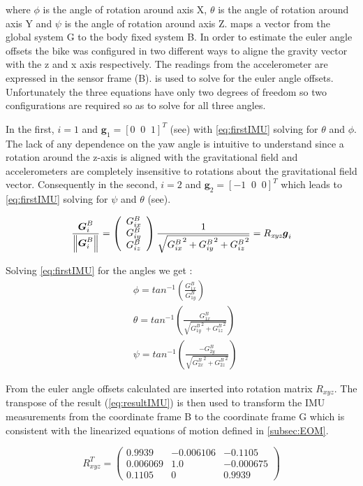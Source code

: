 where \ensuremath{\phi} is the angle of rotation around axis X, \ensuremath{\theta} is the angle of rotation around axis Y and \ensuremath{\psi} is the angle of rotation around axis Z.  maps a vector from the global system G to the body fixed system B. In order to estimate the euler angle offsets the bike was configured in two different ways to aligne the gravity vector with the z and x axis respectively.
The readings from the accelerometer are expressed in the sensor frame (B).   is used to solve for the euler angle offsets. Unfortunately the three equations have only two degrees of freedom so two configurations are required so as to solve for all three angles. 

 In the first, \ensuremath{i=1} and \ensuremath{\boldsymbol{g}_1=[ 0 \;\; 0 \;\; 1]^T } (see) with \cref{eq:firstIMU} solving for \ensuremath{\theta} and \ensuremath{\phi}. The lack of any dependence on the yaw  angle is intuitive to understand since a rotation  around the z-axis is aligned with the gravitational field and accelerometers are completely insensitive to rotations about the gravitational field vector. Consequently in the second, \ensuremath{i=2} and \ensuremath{\boldsymbol{g}_2=[ -1 \;\;0\;\; 0 ]^T} which leads to   \cref{eq:firstIMU} solving for \ensuremath{\psi} and \ensuremath{\theta} (see).
 
 \begin{equation}
 \frac{\boldsymbol{G}_{i}^B}{\left\lVert\boldsymbol{G}_{i}^B\right\rVert}=\left(\begin{array}{l}{G_{i x}^B} \\ {G_{i y}^B} \\ {G_{i z}^B}\end{array}\right)\frac{1}{\sqrt{{G_{i x}^B}^2+{G_{i y}^B}^2+{G_{i z}^B}^2}}=R_{\mathit{xyz}}\boldsymbol{g}_i
\label{eq:firstIMU}
 \end{equation}
 
Solving \cref{eq:firstIMU} for the angles we get :
\begin{align}
   & \phi=tan^{-1}\left(\frac{G_{1x}^B}{G_{1y}^B}\right)
   \label{eq:offset1}
   \\
   & \theta= tan^{-1}\left(\frac{G_{1 x}^B}{\sqrt{{G_{1 y}^B}^{2}+{G_{1 z}^B}^{2}}}\right) 
   \\
   & \psi = tan^{-1}\left(\frac{-G_{2 y}^B}{\sqrt{{G_{2 x}^B}^{2}+{G_{2 z}^B}^{2}}}\right)
   \label{eq:offset3}
\end{align}

From  the euler angle offsets calculated are inserted into rotation matrix \ensuremath{R_{\mathit{xyz}}}. The transpose of the result (\ref{eq:resultIMU}) is then used to transform the IMU measurements from the coordinate frame B to the coordinate frame G which is consistent with the linearized equations of motion defined in \cref{subsec:EOM}.

\begin{equation}
R_{\mathit{xyz}}^T=\left(\begin{array}{ccc} 0.9939 & -0.006106 & -0.1105\\ 0.006069 & 1.0 & -0.000675\\ 0.1105 & 0 & 0.9939 \end{array}\right)
    \label{eq:resultIMU}
\end{equation}